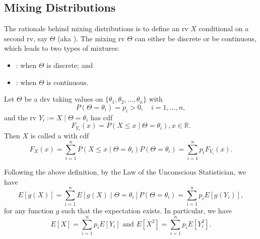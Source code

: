 \documentclass[notoc,notitlepage]{tufte-book}
\begin{document}
\subsection{Mixing Distributions}%
\label{sub:mixing_distributions}

The rationale behind mixing distributions is to define an rv $X$ conditional on a second rv, say $\Theta$ (aka ). The mixing rv $\Theta$ can either be discrete or be continuous, which leads to two types of mixtures:
\begin{itemize}
  \item {}: when $\Theta$ is discrete; and
  \item {}: when $\Theta$ is continuous.
\end{itemize}

\begin{defn}\label{defn:discrete_mixed_distribution}
  Let $\Theta$ be a drv taking values on $\{ \theta_1, \theta_2, \ldots, \theta_n \}$ with
  \begin{equation*}
    P(\Theta = \theta_i) = p_i > 0, \quad i = 1, \ldots, n,
  \end{equation*}
  and the rv $Y_i := X \mid \Theta = \theta_i$ has cdf
  \begin{equation*}
    F_{Y_i}(x) = P(X \leq x \mid \Theta = \theta_i), x \in \mathbb{R}.
  \end{equation*}
  Then $X$ is called a  with cdf
  \begin{equation*}
  F_X(x) = \sum_{i=1}^{n} P(X \leq x \mid \Theta = \theta_i) P(\Theta = \theta_i) = \sum_{i=1}^{n} p_i F_{Y_i}(x).
  \end{equation*}
\end{defn}

Following the above definition, by the Law of the Unconscious Statistician, we have
\begin{equation*}
  E[g(X)] = \sum^{n}_{i=1} E[g(X) \mid \Theta = \theta_i] P(\Theta = \theta_i) = \sum_{i=1}^{n} p_i E[g(Y_i)],
\end{equation*}
for any function $g$ such that the expectation exists. In particular, we have
\begin{equation*}
  E[X] = \sum_{i=1}^{n} p_i E[Y_i] \text{ and } E\left[ X^2 \right] = \sum_{i=1}^{n} p_i E\left[Y_i^2\right].
\end{equation*}
\end{document}

